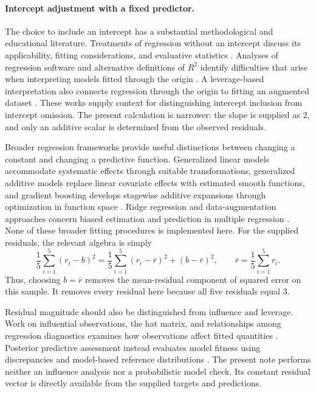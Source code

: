 \documentclass[11pt]{article}
\begin{document}
\paragraph{Intercept adjustment with a fixed predictor.}
The choice to include an intercept has a substantial methodological and educational literature. Treatments of regression without an intercept discuss its applicability, fitting considerations, and evaluative statistics \cite{Hahn1977FittingRegression,Hawkins1980NoteFitting,Eisenhauer2003RegressionThrough}. Analyses of regression software and alternative definitions of $R^2$ identify difficulties that arise when interpreting models fitted through the origin \cite{Gordon1981ErrorsComputer,Kvlseth1985CautionaryNote}. A leverage-based interpretation also connects regression through the origin to fitting an augmented dataset \cite{Casella1983LeverageRegression}. These works supply context for distinguishing intercept inclusion from intercept omission. The present calculation is narrower: the slope is supplied as $2$, and only an additive scalar is determined from the observed residuals.

Broader regression frameworks provide useful distinctions between changing a constant and changing a predictive function. Generalized linear models accommodate systematic effects through suitable transformations, generalized additive models replace linear covariate effects with estimated smooth functions, and gradient boosting develops stagewise additive expansions through optimization in function space \cite{Nelder1972GeneralizedLinear,Hastie1986GeneralizedAdditive,Friedman2001GreedyFunction}. Ridge regression and data-augmentation approaches concern biased estimation and prediction in multiple regression \cite{Hoerl1970RidgeRegression,Allen1974RelationshipBetween}. None of these broader fitting procedures is implemented here. For the supplied residuals, the relevant algebra is simply
\[
\frac{1}{5}\sum_{i=1}^{5}(r_i-b)^2
=
\frac{1}{5}\sum_{i=1}^{5}(r_i-\bar r)^2
+(b-\bar r)^2,
\qquad
\bar r=\frac{1}{5}\sum_{i=1}^{5}r_i.
\]
Thus, choosing $b=\bar r$ removes the mean-residual component of squared error on this sample. It removes every residual here because all five residuals equal $3$.

Residual magnitude should also be distinguished from influence and leverage. Work on influential observations, the hat matrix, and relationships among regression diagnostics examines how observations affect fitted quantities \cite{Cook1977DetectionInfluential,Hoaglin1978HatMatrix,Chatterjee1986InfluentialObservations}. Posterior predictive assessment instead evaluates model fitness using discrepancies and model-based reference distributions \cite{Gelman1996PosteriorPredictive}. The present note performs neither an influence analysis nor a probabilistic model check. Its constant residual vector is directly available from the supplied targets and predictions.
\end{document}
